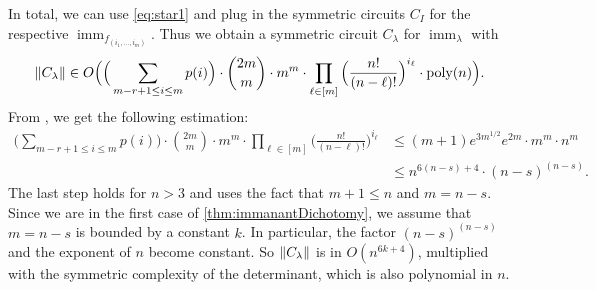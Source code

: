 \documentclass[11pt, DIV=15]{scrarticle}
\theoremstyle{definition}
\theoremstyle{plain}
\theoremstyle{remark}
\DeclarePairedDelimiter{\norm}{\lVert}{\rVert}
\DeclareMathOperator{\imm}{imm}
\begin{document}
In total, we can use \cref{eq:star1} and plug in the symmetric circuits $C_I$ for the respective $\imm_{f_{(i_1,\dots ,i_m)}}$. Thus we obtain a symmetric circuit $C_\lambda$ for $\imm_\lambda$ with
\[
\norm{C_\lambda} \in O\Big( \Big(\sum_{m-r+1\leq i \leq m} p(i)\Big) \cdot \binom{2m}{m} \cdot  m^m \cdot \prod_{\ell \in [m]} \Big(\frac{n!}{(n-\ell)!} \Big)^{i_\ell} \cdot \text{poly}(n) \Big).
\]
From \cite{hartmann1985complexity}, we get the following estimation:
\begin{align*}
 \Big(\sum_{m-r+1\leq i \leq m} p(i)\Big) \cdot \binom{2m}{m} \cdot m^m \cdot \prod_{\ell \in [m]} \Big(\frac{n!}{(n-\ell)!} \Big)^{i_\ell} &\leq (m+1)e^{3m^{1/2}}e^{2m} \cdot m^m \cdot n^m\\
  &\leq n^{6(n-s)+4} \cdot (n-s)^{(n-s)}.
\end{align*}
The last step holds for $n > 3$ and uses the fact that $m+1 \leq n$ and $m=n-s$. Since we are in the first case of \cref{thm:immanantDichotomy}, we assume that $m = n-s$ is bounded by a constant $k$. In particular, the factor $(n-s)^{(n-s)}$ and the exponent of $n$ become constant.
So $\norm{C_\lambda}$ is in $O( n^{6k+4})$, multiplied with the symmetric complexity of the determinant, which is also polynomial in $n$.

	
	
\end{document}
